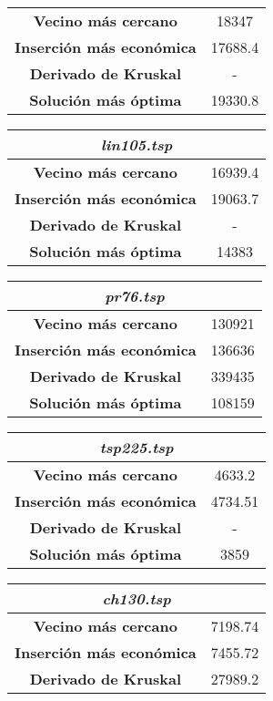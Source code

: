 \documentclass[12pt,spanish]{article}
\begin{document}
\begin{figure}[H]
\begin{tabular}{|c|c|}
\hline
\textbf{Vecino más cercano} & 18347\\
\textbf{Inserción más económica} & 17688.4 \\
\textbf{Derivado de Kruskal} & -\\
\textbf{Solución más óptima} & 19330.8\\
\hline	
\end{tabular}
\vspace{0.5cm}
\quad
\begin{tabular}{|c|c|}
\hline	
\multicolumn{2}{|c|}{\textit{lin105.tsp}}\\
\hline
\textbf{Vecino más cercano} & 16939.4\\
\textbf{Inserción más económica} & 19063.7\\
\textbf{Derivado de Kruskal} & -\\
\textbf{Solución más óptima} & 14383\\
\hline	
\end{tabular}
\vspace{0.5cm}
\quad
\begin{tabular}{|c|c|}
\hline	
\multicolumn{2}{|c|}{\textit{pr76.tsp}}\\
\hline
\textbf{Vecino más cercano} & 130921\\
\textbf{Inserción más económica} & 136636\\
\textbf{Derivado de Kruskal} & 339435\\
\textbf{Solución más óptima} & 108159\\
\hline	
\end{tabular}
\vspace{0.5cm}
\quad
\begin{tabular}{|c|c|}
\hline	
\multicolumn{2}{|c|}{\textit{tsp225.tsp}}\\
\hline
\textbf{Vecino más cercano} & 4633.2\\
\textbf{Inserción más económica} & 4734.51\\
\textbf{Derivado de Kruskal} & -\\
\textbf{Solución más óptima} & 3859 \\
\hline	
\end{tabular}
\vspace{0.5cm}
\quad
\begin{tabular}{|c|c|}
\hline	
\multicolumn{2}{|c|}{\textit{ch130.tsp}}\\
\hline
\textbf{Vecino más cercano} & 7198.74\\
\textbf{Inserción más económica} & 7455.72\\
\textbf{Derivado de Kruskal} & 27989.2\\

\end{tabular}
\end{figure}
\end{document}
